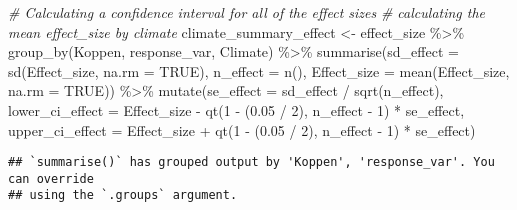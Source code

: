 \documentclass[
]{article}
\newenvironment{Shaded}{\begin{snugshade}}{\end{snugshade}}
\newcommand{\AttributeTok}[1]{\textcolor[rgb]{0.77,0.63,0.00}{#1}}
\newcommand{\CommentTok}[1]{\textcolor[rgb]{0.56,0.35,0.01}{\textit{#1}}}
\newcommand{\ConstantTok}[1]{\textcolor[rgb]{0.00,0.00,0.00}{#1}}
\newcommand{\DecValTok}[1]{\textcolor[rgb]{0.00,0.00,0.81}{#1}}
\newcommand{\FloatTok}[1]{\textcolor[rgb]{0.00,0.00,0.81}{#1}}
\newcommand{\FunctionTok}[1]{\textcolor[rgb]{0.00,0.00,0.00}{#1}}
\newcommand{\NormalTok}[1]{#1}
\newcommand{\OtherTok}[1]{\textcolor[rgb]{0.56,0.35,0.01}{#1}}
\newcommand{\SpecialCharTok}[1]{\textcolor[rgb]{0.00,0.00,0.00}{#1}}
\begin{document}
\begin{Shaded}
\begin{Highlighting}[]
\CommentTok{\# Calculating a confidence interval for all of the effect sizes}
\CommentTok{\# calculating the mean effect\_size by climate}
\NormalTok{climate\_summary\_effect }\OtherTok{\textless{}{-}}\NormalTok{ effect\_size }\SpecialCharTok{\%\textgreater{}\%}
  \FunctionTok{group\_by}\NormalTok{(Koppen, response\_var, Climate) }\SpecialCharTok{\%\textgreater{}\%}
  \FunctionTok{summarise}\NormalTok{(}\AttributeTok{sd\_effect =} \FunctionTok{sd}\NormalTok{(Effect\_size, }\AttributeTok{na.rm =} \ConstantTok{TRUE}\NormalTok{),}
            \AttributeTok{n\_effect =} \FunctionTok{n}\NormalTok{(),}
            \AttributeTok{Effect\_size =} \FunctionTok{mean}\NormalTok{(Effect\_size, }\AttributeTok{na.rm =} \ConstantTok{TRUE}\NormalTok{)) }\SpecialCharTok{\%\textgreater{}\%} 
 \FunctionTok{mutate}\NormalTok{(}\AttributeTok{se\_effect =}\NormalTok{ sd\_effect }\SpecialCharTok{/} \FunctionTok{sqrt}\NormalTok{(n\_effect),}
         \AttributeTok{lower\_ci\_effect =}\NormalTok{ Effect\_size }\SpecialCharTok{{-}} \FunctionTok{qt}\NormalTok{(}\DecValTok{1} \SpecialCharTok{{-}}\NormalTok{ (}\FloatTok{0.05} \SpecialCharTok{/} \DecValTok{2}\NormalTok{), n\_effect }\SpecialCharTok{{-}} \DecValTok{1}\NormalTok{) }\SpecialCharTok{*}\NormalTok{ se\_effect,}
         \AttributeTok{upper\_ci\_effect =}\NormalTok{ Effect\_size }\SpecialCharTok{+} \FunctionTok{qt}\NormalTok{(}\DecValTok{1} \SpecialCharTok{{-}}\NormalTok{ (}\FloatTok{0.05} \SpecialCharTok{/} \DecValTok{2}\NormalTok{), n\_effect }\SpecialCharTok{{-}} \DecValTok{1}\NormalTok{) }\SpecialCharTok{*}\NormalTok{ se\_effect)}
\end{Highlighting}
\end{Shaded}

\begin{verbatim}
## `summarise()` has grouped output by 'Koppen', 'response_var'. You can override
## using the `.groups` argument.
\end{verbatim}
\end{document}
